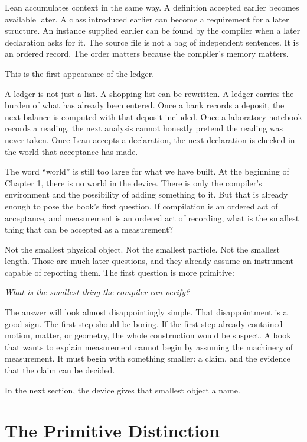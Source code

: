 Lean accumulates context in the same way. A definition accepted earlier becomes
available later. A class introduced earlier can become a requirement for a
later structure. An instance supplied earlier can be found by the compiler when
a later declaration asks for it. The source file is not a bag of independent
sentences. It is an ordered record. The order matters because the compiler's
memory matters.

This is the first appearance of the ledger.

A ledger is not just a list. A shopping list can be rewritten. A ledger carries
the burden of what has already been entered. Once a bank records a deposit, the
next balance is computed with that deposit included. Once a laboratory notebook
records a reading, the next analysis cannot honestly pretend the reading was
never taken. Once Lean accepts a declaration, the next declaration is checked in
the world that acceptance has made.

The word ``world'' is still too large for what we have built. At the beginning
of Chapter 1, there is no world in the device. There is only the compiler's
environment and the possibility of adding something to it. But that is already
enough to pose the book's first question. If compilation is an ordered act of
acceptance, and measurement is an ordered act of recording, what is the smallest
thing that can be accepted as a measurement?

Not the smallest physical object. Not the smallest particle. Not the smallest
length. Those are much later questions, and they already assume an instrument
capable of reporting them. The first question is more primitive:

\begin{center}
\emph{What is the smallest thing the compiler can verify?}
\end{center}

The answer will look almost disappointingly simple. That disappointment is a
good sign. The first step should be boring. If the first step already contained
motion, matter, or geometry, the whole construction would be suspect. A book
that wants to explain measurement cannot begin by assuming the machinery of
measurement. It must begin with something smaller: a claim, and the evidence
that the claim can be decided.

In the next section, the device gives that smallest object a name.

\section{The Primitive Distinction}
\label{se:primitive-distinction}

